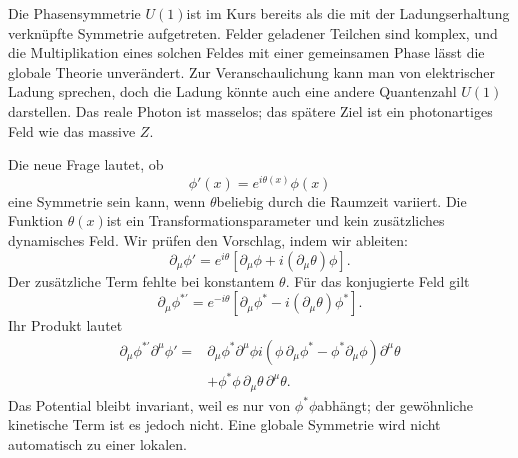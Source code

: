 Die Phasensymmetrie \(U(1)\)ist im Kurs bereits als die mit der Ladungserhaltung verknüpfte Symmetrie aufgetreten. Felder geladener Teilchen sind komplex, und die Multiplikation eines solchen Feldes mit einer gemeinsamen Phase lässt die globale Theorie unverändert. Zur Veranschaulichung kann man von elektrischer Ladung sprechen, doch die Ladung könnte auch eine andere Quantenzahl \(U(1)\)darstellen. Das reale Photon ist masselos; das spätere Ziel ist ein photonartiges Feld wie das massive \(Z\).

Die neue Frage lautet, ob
\begin{equation}
  \phi'(x)=e^{i\theta(x)}\phi(x)
  \label{eq:l07-local-u1}
\end{equation}
eine Symmetrie sein kann, wenn \(\theta\)beliebig durch die Raumzeit variiert. Die Funktion \(\theta(x)\)ist ein Transformationsparameter und kein zusätzliches dynamisches Feld. Wir prüfen den Vorschlag, indem wir ableiten:
\begin{equation}
  \partial_\mu\phi'
  =e^{i\theta}
   \left[\partial_\mu\phi+i(\partial_\mu\theta)\phi\right].
  \label{eq:l07-local-derivative}
\end{equation}
Der zusätzliche Term fehlte bei konstantem \(\theta\). Für das konjugierte Feld gilt
\begin{equation}
  \partial_\mu\phi^{*\prime}
  =e^{-i\theta}
   \left[\partial_\mu\phi^*-i(\partial_\mu\theta)\phi^*\right].
\end{equation}
Ihr Produkt lautet
\begin{align}
  \partial_\mu\phi^{*\prime}\partial^\mu\phi'
  ={}&
  \partial_\mu\phi^*\partial^\mu\phi
  i\left(
      \phi\,\partial_\mu\phi^*
      -\phi^*\partial_\mu\phi
    \right)\partial^\mu\theta
  \nonumber\\
  &+\phi^*\phi\,
    \partial_\mu\theta\,\partial^\mu\theta.
  \label{eq:l07-local-failure}
\end{align}
Das Potential bleibt invariant, weil es nur von \(\phi^*\phi\)abhängt; der gewöhnliche kinetische Term ist es jedoch nicht. Eine globale Symmetrie wird nicht automatisch zu einer lokalen.

\begin{classroomqa}
\end{classroomqa}

